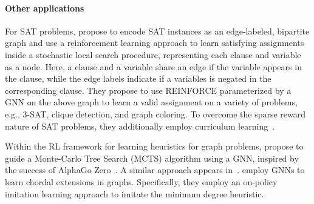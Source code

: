\documentclass[twoside,11pt]{article}
\begin{document}
\paragraph{Other applications}

For SAT problems, \citet{yolcu2019learning} propose to encode SAT instances as an edge-labeled, bipartite graph and use a reinforcement learning approach to learn satisfying assignments inside a stochastic local search procedure, representing each clause and variable as a node. Here, a clause and a variable share an edge if the variable appears in the clause, while the edge labels indicate if a variables is negated in the corresponding clause.  They propose to use REINFORCE parameterized by a GNN on the above graph to learn a valid assignment on a variety of problems, e.g., $3$-SAT, clique detection, and graph coloring. To overcome the sparse reward nature of SAT problems, they additionally employ curriculum learning~\citep{Ben+2009}.

Within the RL framework for learning heuristics for graph problems, \cite{abe2019solving} propose to guide a Monte-Carlo Tree Search (MCTS) algorithm using a GNN, inspired by the success of AlphaGo Zero~\citep{silver2017mastering}. A similar approach appears in~\citep{drori2020learning}. \citet{Liu+2019} employ GNNs to learn chordal extensions in graphs. Specifically, they employ an on-policy imitation learning approach to imitate the minimum degree heuristic. 













\end{document}
